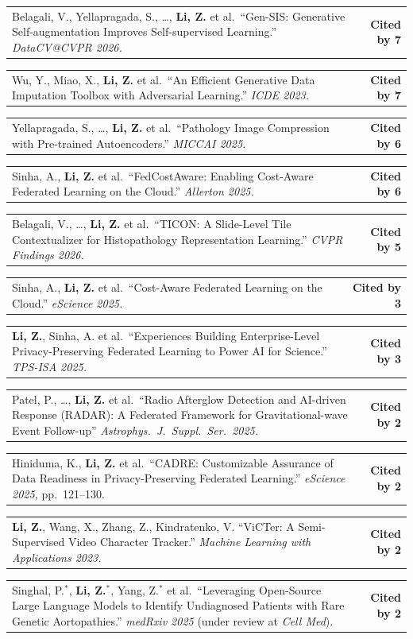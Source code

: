 \documentclass[letterpaper,11pt]{article}
\makeatletter
\newcommand{\CiteEntry}[2]{%
  \item \begin{tabularx}{\linewidth}[t]{@{}X@{\hspace{6pt}}r@{}}
    \small #1 & \small\textbf{Cited by #2}%
  \end{tabularx}%
}
\makeatother
\begin{document}
\begin{enumerate}[leftmargin=1cm, label={[\arabic*]}, itemsep=3pt]
  \CiteEntry{Belagali, V., Yellapragada, S., \ldots, \textbf{Li, Z.} et al.\ ``Gen-SIS: Generative Self-augmentation Improves Self-supervised Learning.'' \textit{DataCV@CVPR 2026.}}{7}

  \CiteEntry{Wu, Y., Miao, X., \textbf{Li, Z.} et al.\ ``An Efficient Generative Data Imputation Toolbox with Adversarial Learning.'' \textit{ICDE 2023.}}{7}

  \CiteEntry{Yellapragada, S., \ldots, \textbf{Li, Z.} et al.\ ``Pathology Image Compression with Pre-trained Autoencoders.'' \textit{MICCAI 2025.}}{6}

  \CiteEntry{Sinha, A., \textbf{Li, Z.} et al.\ ``FedCostAware: Enabling Cost-Aware Federated Learning on the Cloud.'' \textit{Allerton 2025.}}{6}

  \CiteEntry{Belagali, V., \ldots, \textbf{Li, Z.} et al.\ ``TICON: A Slide-Level Tile Contextualizer for Histopathology Representation Learning.'' \textit{CVPR Findings 2026.}}{5}

  \CiteEntry{Sinha, A., \textbf{Li, Z.} et al.\ ``Cost-Aware Federated Learning on the Cloud.'' \textit{eScience 2025.}}{3}

  \CiteEntry{\textbf{Li, Z.}, Sinha, A. et al.\ ``Experiences Building Enterprise-Level Privacy-Preserving Federated Learning to Power AI for Science.'' \textit{TPS-ISA 2025.}}{3}

  \CiteEntry{Patel, P., \ldots, \textbf{Li, Z.} et al.\ ``Radio Afterglow Detection and AI-driven Response (RADAR): A Federated Framework for Gravitational-wave Event Follow-up'' \textit{Astrophys.\ J.\ Suppl.\ Ser.\ 2025.}}{2}


  \CiteEntry{Hiniduma, K., \textbf{Li, Z.} et al.\ ``CADRE: Customizable Assurance of Data Readiness in Privacy-Preserving Federated Learning.'' \textit{eScience 2025,} pp.\ 121--130.}{2}

  \CiteEntry{\textbf{Li, Z.}, Wang, X., Zhang, Z., Kindratenko, V. ``ViCTer: A Semi-Supervised Video Character Tracker.'' \textit{Machine Learning with Applications 2023.}}{2}


  \CiteEntry{Singhal, P.$^*$, \textbf{Li, Z.$^*$}, Yang, Z.$^*$ et al.\ ``Leveraging Open-Source Large Language Models to Identify Undiagnosed Patients with Rare Genetic Aortopathies.'' \textit{medRxiv 2025} (under review at \textit{Cell Med}).}{2}


\end{enumerate}
\end{document}

